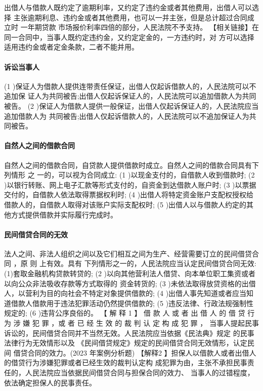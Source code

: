 \documentclass[UTF8,12pt]{ctexart}
\numberwithin{equation}{section} %
\numberwithin{figure}{section}
\numberwithin{table}{section}
\begin{document}
	出借人与借款人既约定了逾期利率，又约定了违约金或者其他费用，出借人可以选择 主张逾期利息、违约金或者其他费用，也可以一并主张，但是总计超过合同成立时 一年期贷款 市场报价利率四倍的部分，人民法院不予支持。
	【相关链接】在同一合同中，当事人既约定违约金，又约定定金的，一方违约时，对 方可以选择适用违约金或者定金条款，二者不能并用。
	
	\paragraph{诉讼当事人}
	(1 )保证人为借款人提供连带责任保证，出借人仅起诉借款人的，人民法院可以不追加保 证人为共同被告;出借人仅起诉保证人的，人民法院可以追加借款人为共同被告。
	(2 )保证人为借款人提供一般保证，出借人仅起诉保证人的，人民法院应当追加借款人为 共同被告;出借人仅起诉借款人的，人民法院可以不追加保证人为共同被告。
	
	\paragraph{自然人之间的借款合同} 自然人之间的借款合同，自贷款人提供借款时成立。自然人之间的借款合同具有下列情形 之 一的，可以视为合同成立:
	(1 )以现金支付的，自借款人收到借款时;
	(2 )以银行转账、网上电子汇款等形式支付的，自资金到达借款人账户时;
	(3 )以票据交付的，自借款人依法取得票据权利时;
	(4 )出借人将特定资金账户支配权授权给借款人的，自借款人取得对该账户实际支配权时; (5 )出借人以与借款人约定的其他方式提供借款并实际履行完成时。
	
	\paragraph{民间借贷合同的无效} 法人之间、非法人组织之间以及它们相互之间为生产、经营需要订立的民间借贷合同 ，原 则 上有效。具有 下列情形之一的，人民法院应当认定民间借贷合同无效: (1)套取金融机构贷款转贷的;
	(2 )以向其他营利法人借贷、向本单位职工集资或者以向公众非法吸收存款等方式取得的 资金转货的;
	(3 )未依法取得放贷资格的出借人，以营利为目的向社会不特定对象提供借款的;
	(4 )出借人事先知道或者应当知道借款人借款用于违法犯罪活动仍然提供借款的;
	(5 )违反法律、行政法规强制性规定的;
	(6 )违背公序良俗的。
	【 解 释 1 】 借 款 人 或 者 出 借 人 的 借 贷 行 为 涉 嫌 犯 罪 ，或 者 已 经 生 效 的 裁 判 认 定 构 成 犯 罪 ， 当事人提起民事诉讼的，民间借贷合同并不当然无效。人民法院应当依据《民法典》规定 的民事法律行为无效情形以及 《民间借贷规定》规定的民间借贷合同无效情形，认定民间 借贷合同的效力。(2023 年案例分析题)
	【解释2 】担保人以借款人或者出借人的借贷行为涉嫌犯罪或者已经生效的裁判认定构 成犯罪为由，主张不承担民事责任的，人民法院应当依据民间借贷合同与担保合同的效力、 当事人的过错程度，依法确定担保人的民事责任。
	
\end{document}
